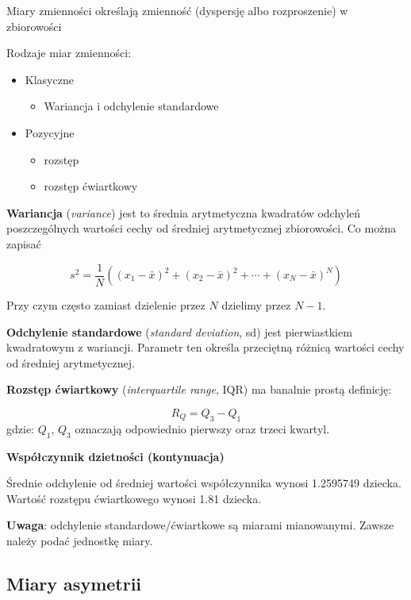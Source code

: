 \documentclass[
  openany]{book}
\providecommand{\tightlist}{%
  \setlength{\itemsep}{0pt}\setlength{\parskip}{0pt}}
\begin{document}
Miary zmienności określają zmienność (dyspersję albo rozproszenie) w zbiorowości

Rodzaje miar zmienności:

\begin{itemize}
\tightlist
\item
  Klasyczne

  \begin{itemize}
  \tightlist
  \item
    Wariancja i odchylenie standardowe
  \end{itemize}
\item
  Pozycyjne

  \begin{itemize}
  \tightlist
  \item
    rozstęp
  \item
    rozstęp ćwiartkowy
  \end{itemize}
\end{itemize}

\textbf{Wariancja} (\emph{variance}) jest to średnia arytmetyczna kwadratów
odchyleń poszczególnych wartości cechy od średniej arytmetycznej
zbiorowości. Co można zapisać

\[s^2 = \frac{1}{N} \left( (x_1 - \bar x)^2 + (x_2 - \bar x)^2 + 
\cdots +  (x_N - \bar x)^N \right)\]

Przy czym często zamiast dzielenie przez \(N\) dzielimy przez \(N-1\).

\textbf{Odchylenie standardowe} (\emph{standard deviation}, sd) jest
pierwiastkiem kwadratowym z wariancji. Parametr ten określa
przeciętną różnicą wartości cechy od średniej arytmetycznej.

\textbf{Rozstęp ćwiartkowy} (\emph{interquartile range}, IQR) ma banalnie prostą definicję:

\[
R_Q = Q_3 - Q_1
\]
gdzie: \(Q_1\), \(Q_3\) oznaczają odpowiednio pierwszy oraz trzeci kwartyl.

\begin{example}
\textbf{Współczynnik dzietności (kontynuacja)}

Średnie odchylenie od średniej wartości współczynnika wynosi 1.2595749 dziecka.
Wartość rozstępu ćwiartkowego wynosi 1.81 dziecka.
\end{example}

\textbf{Uwaga}: odchylenie standardowe/ćwiartkowe są miarami mianowanymi. Zawsze należy
podać jednostkę miary.

\hypertarget{miary-asymetrii}{%
\subsection{Miary asymetrii}\label{miary-asymetrii}}
\end{document}
